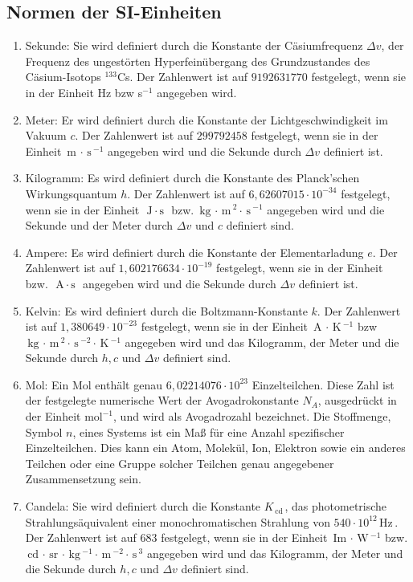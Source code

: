 \documentclass[a4paper,12pt]{article}
\numberwithin{equation}{section}
\begin{document}
\subsection{Normen der SI-Einheiten}
\begin{enumerate}[label=$\cdot$]
        \item Sekunde: Sie wird definiert durch die Konstante der Cäsiumfrequenz $\Delta v$, der Frequenz des ungestörten Hyperfeinübergang des Grundzustandes des Cäsium-Isotops $^{133}$Cs. Der Zahlenwert ist auf $9192631770$ festgelegt, wenn sie in der Einheit Hz bzw s$^{-1}$ angegeben wird. 
        \item Meter: Er wird definiert durch die Konstante der Lichtgeschwindigkeit im Vakuum $c$. Der Zahlenwert ist auf $299792458$ festgelegt, wenn sie in der Einheit $\,\text{m}\,\cdot \,\text{s}\,^{-1}$ angegeben wird und die Sekunde durch $\Delta v$ definiert ist.
        \item Kilogramm: Es wird definiert durch die Konstante des Planck'schen Wirkungsquantum $h$. Der Zahlenwert ist auf $6,62607015\cdot 10^{-34}$ festgelegt, wenn sie in der Einheit $\,\text{J}\,\cdot \,\text{s}\,$ bzw. $\,\text{kg}\,\cdot \,\text{m}\,^2\cdot \,\text{s}\, ^{-1} $ angegeben wird und die Sekunde und der Meter durch $\Delta v$ und $c$ definiert sind.
        \item Ampere: Es wird definiert durch die Konstante der Elementarladung $e$. Der Zahlenwert ist auf $1,602176634\cdot 10^{-19}$ festgelegt, wenn sie in der Einheit \,\, bzw. $\,\text{A}\,\cdot \,\text{s}\,$ angegeben wird und die Sekunde durch $\Delta v$ definiert ist.
        \item Kelvin: Es wird definiert durch die Boltzmann-Konstante $k$. Der Zahlenwert ist auf $1,380649\cdot 10^{-23}$ festgelegt, wenn sie in der Einheit $\,\text{A}\,\cdot \,\text{K}\,^{-1}$ bzw $\,\text{kg}\,\cdot \,\text{m}\,^2\cdot \,\text{s}\,^{-2}\cdot \,\text{K}\,^{-1}$ angegeben wird und das Kilogramm, der Meter und die Sekunde durch $h,c$ und $\Delta v$ definiert sind.
        \item Mol: Ein Mol enthält genau $6,02214076\cdot 10^{23}$ Einzelteilchen. Diese Zahl ist der festgelegte numerische Wert der Avogadrokonstante $N_A$, ausgedrückt in der Einheit $\text{mol}^{-1}$, und wird als Avogadrozahl bezeichnet. Die Stoffmenge, Symbol $n$, eines Systems ist ein Maß für eine Anzahl spezifischer Einzelteilchen. Dies kann ein Atom, Molekül, Ion, Elektron sowie ein anderes Teilchen oder eine Gruppe solcher Teilchen genau angegebener Zusammensetzung sein.
        \item Candela: Sie wird definiert durch die Konstante $K_{\,\text{cd}\,}$, das photometrische Strahlungsäquivalent einer monochromatischen Strahlung von $540\cdot 10^{12}\,\text{Hz}\,$. Der Zahlenwert ist auf $683$ festgelegt, wenn sie in der Einheit $\,\text{Im}\,\cdot \,\text{W}\,^{-1}$ bzw. $\,\text{cd}\,\cdot \,\text{sr}\,\cdot \,\text{kg}\,^{-1}\cdot \,\text{m}\, ^{-2}\cdot \,\text{s}\, ^{3}$ angegeben wird und das Kilogramm, der Meter und die Sekunde durch $h,c$ und $\Delta v$ definiert sind.
\end{enumerate}
\end{document}
